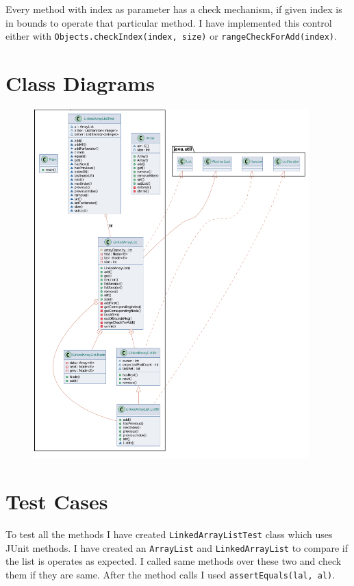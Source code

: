 \documentclass[a4paper]{article}
\begin{document}
\begin{large}
Every method with index as parameter has a check mechanism, if given index is in bounds to operate that particular method. I have implemented this control either with \texttt{Objects.checkIndex(index, size)} or \texttt{rangeCheckForAdd(index)}.

\newpage

\section{Class Diagrams}


\begin{figure}[htp]
  \centering
  \includegraphics[width=0.95\textwidth]{class-diagram}
\end{figure}

\newpage


\section{Test Cases}

To test all the methods I have created \texttt{LinkedArrayListTest} class which uses JUnit methods. I have created an \texttt{ArrayList} and \texttt{LinkedArrayList} to compare if the list is operates as expected. I called same methods over these two and check them if they are same. After the method calls I used \texttt{assertEquals(lal, al)}.


\end{large}
\end{document}
